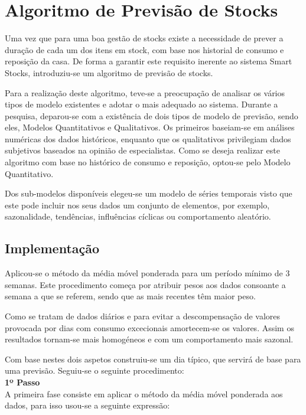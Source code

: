 \section{Algoritmo de Previsão de Stocks}\label{sec43}

Uma vez que para uma boa gestão de stocks existe a necessidade de prever a duração de cada um dos itens em stock, com base nos historial de consumo e reposição da casa. De forma a garantir este requisito inerente ao sistema Smart Stocks, introduziu-se um algoritmo de previsão de stocks.

Para a realização deste algoritmo, teve-se a preocupação de analisar os vários tipos de modelo existentes e adotar o mais adequado ao sistema. Durante a pesquisa, deparou-se com a existência de dois tipos de modelo de previsão, sendo eles, Modelos Quantitativos e Qualitativos. Os primeiros baseiam-se em análises numéricas dos dados históricos, enquanto que os qualitativos privilegiam dados subjetivos baseados na opinião de especialistas. Como se deseja realizar este algoritmo com base no histórico de consumo e reposição, optou-se pelo Modelo Quantitativo. 

Dos sub-modelos disponíveis elegeu-se um modelo de séries temporais visto que este pode incluir nos seus dados um conjunto de elementos, por exemplo, sazonalidade, tendências, influências cíclicas ou comportamento aleatório.




%
%
\subsection{Implementação}\label{subsec431}

Aplicou-se o método da média móvel ponderada para um período mínimo de 3 semanas. Este procedimento começa por atribuir pesos aos dados consoante a semana a que se referem, sendo que as mais recentes têm maior peso.

Como se tratam de dados diários e para evitar a descompensação de valores provocada por dias com consumo excecionais amortecem-se  os valores. Assim os resultados tornam-se mais homogéneos e com um comportamento mais sazonal.   

Com base nestes dois aspetos construiu-se um dia típico, que servirá de base para uma previsão. Seguiu-se o seguinte procedimento:\\

\textbf{1º Passo}\\
A primeira fase consiste em aplicar o método da média móvel ponderada aos dados, para isso usou-se a seguinte expressão:

